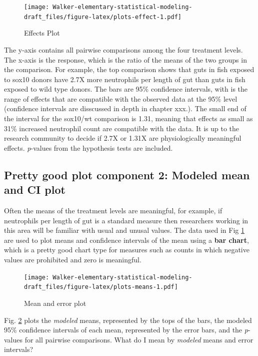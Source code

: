 \documentclass[]{book}
\begin{document}
\begin{figure}
\centering
\texttt{[image: Walker-elementary-statistical-modeling-draft\_files/figure-latex/plots-effect-1.pdf]}
\caption{\label{fig:plots-effect}Effects Plot}
\end{figure}

The y-axis contains all pairwise comparisons among the four treatment levels. The x-axis is the response, which is the ratio of the means of the two groups in the comparison. For example, the top comparison shows that guts in fish exposed to sox10 donors have 2.7X more neutrophils per length of gut than guts in fish exposed to wild type donors. The bars are 95\% confidence intervals, with is the range of effects that are compatible with the observed data at the 95\% level (confidence intervals are disscussed in depth in chapter xxx.). The small end of the interval for the sox10/wt comparison is 1.31, meaning that effects as small as 31\% increased neutrophil count are compatible with the data. It is up to the research community to decide if 2.7X or 1.31X are physiologically meaningful effects. \emph{p}-values from the hypothesis tests are included.

\hypertarget{pretty-good-plot-component-2-modeled-mean-and-ci-plot}{%
\subsection{Pretty good plot component 2: Modeled mean and CI plot}\label{pretty-good-plot-component-2-modeled-mean-and-ci-plot}}

Often the means of the treatment levels are meaningful, for example, if neutrophils per length of gut is a standard measure then researchers working in this area will be familiar with usual and unusal values. The data used in Fig \ref{fig:plots-effect} are used to plot means and confidence intervals of the mean using a \textbf{bar chart}, which is a pretty good chart type for measures such as counts in which negative values are prohibited and zero is meaningful.

\begin{figure}
\centering
\texttt{[image: Walker-elementary-statistical-modeling-draft\_files/figure-latex/plots-means-1.pdf]}
\caption{\label{fig:plots-means}Mean and error plot}
\end{figure}

Fig. \ref{fig:plots-means} plots the \emph{modeled} means, represented by the tops of the bars, the modeled 95\% confidence intervals of each mean, represented by the error bars, and the \emph{p}-values for all pairwise comparisons. What do I mean by \emph{modeled} means and error intervals?
\end{document}
